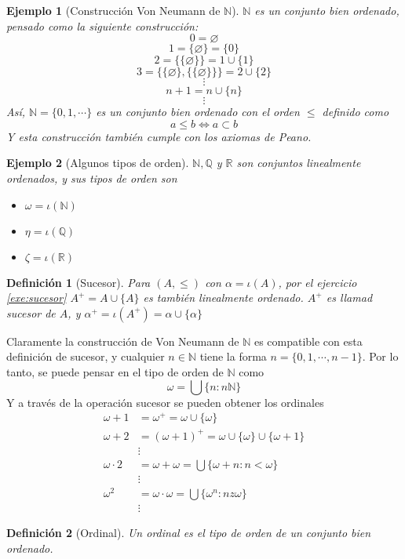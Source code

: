 \documentclass[12pt,letterpaper,titlepage]{article}
\let\emptyset\varnothing
\newtheorem*{defn}{Definición}
\newtheorem*{exa}{Ejemplo}
\theoremstyle{definition}
\newcommand\<{\langle}
\renewcommand\>{\rangle}
\begin{document}
\begin{exa}[Construcción Von Neumann de $\mathbb{N}$]
$\mathbb{N}$ es un conjunto bien ordenado, pensado como la siguiente construcción:
$$0=\emptyset$$
$$1=\{\emptyset\}=\{0\}$$
$$2=\{\{\emptyset\}\}=1\cup\{1\}$$
$$3=\{\{\emptyset\},\{\{\emptyset\}\}\}=2\cup\{2\}$$
$$\vdots$$
$$n+1=n\cup \{n\}$$
$$\vdots$$
Así, $\mathbb{N}=\{0,1,\cdots\}$ es un conjunto bien ordenado con el orden $\leq$ definido como 
$$a\leq b \iff a\subset b$$
Y esta construcción también cumple con los axiomas de Peano.
\end{exa}
\begin{exa}[Algunos tipos de orden]
$\mathbb{N},\mathbb{Q}$ y $\mathbb{R}$ son conjuntos linealmente ordenados, y sus tipos de orden son 
\begin{itemize}
    \item $\omega=\iota(\mathbb{N})$
    \item $\eta=\iota(\mathbb{Q})$
    \item $\zeta=\iota(\mathbb{R})$
\end{itemize}
\end{exa}
\begin{defn}[Sucesor]
  Para $(A,\leq)$ con $\alpha=\iota(A)$, por el ejercicio \ref{exe:sucesor} $A^+=A\cup\{A\}$ es también linealmente ordenado. $A^+$ es llamad sucesor de $A$, y $\alpha^+=\iota(A^+)=\alpha\cup\{\alpha\}$
\end{defn}
Claramente la construcción de Von Neumann de $\mathbb{N}$ es compatible con esta definición de sucesor, y cualquier $n\in\mathbb{N}$ tiene la forma $n=\{0,1,\cdots,n-1\}$. Por lo tanto, se puede pensar en el tipo de orden de $\mathbb{N}$ como 
$$\omega=\bigcup\{n:n\mathbb{N}\}$$
Y a través de la operación sucesor se pueden obtener los ordinales
\begin{align*}
    \omega+1&=\omega^+=\omega\cup\{\omega\}\\
    \omega+2&=(\omega+1)^+=\omega\cup\{\omega\}\cup\{\omega+1\}\\
    &\vdots\\
    \omega\cdot2&=\omega+\omega=\bigcup\{\omega+n : n<\omega\}\\
    &\vdots\\
    \omega^2&=\omega\cdot\omega=\bigcup\{\omega^n:nz\omega\}\\
    &\vdots
\end{align*}
\begin{defn}[Ordinal]
  Un ordinal es el tipo de orden de un conjunto bien ordenado.
\end{defn}
\end{document}

